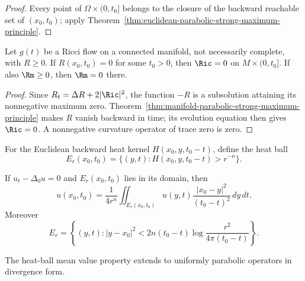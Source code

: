 \begin{proof}
\sketch
Every point of $\Omega\times(0,t_0]$ belongs to the closure of the backward
reachable set of $(x_0,t_0)$; apply
Theorem~\ref{thm:euclidean-parabolic-strong-maximum-principle}.
\end{proof}

\begin{corollary}
\label{cor:ricci-flow-scalar-curvature-strong-maximum-principle}
Let $g(t)$ be a Ricci flow on a connected manifold, not necessarily complete,
with $R\geq0$.  If $R(x_0,t_0)=0$ for some $t_0>0$, then
$\Ric=0$ on $M\times(0,t_0]$.  If also $\Rm\geq0$, then $\Rm=0$ there.
\end{corollary}

\begin{proof}
\sketch
Since $R_t=\Delta R+2|\Ric|^2$, the function $-R$ is a subsolution attaining
its nonnegative maximum zero.  Theorem~\ref{thm:manifold-parabolic-strong-maximum-principle}
makes $R$ vanish backward in time; its evolution equation then gives
$\Ric=0$.  A nonnegative curvature operator of trace zero is zero.
\end{proof}

For the Euclidean backward heat kernel $H(x_0,y,t_0-t)$, define the heat ball
\[
E_r(x_0,t_0)=\{(y,t):H(x_0,y,t_0-t)>r^{-n}\}.
\]

\begin{corollary}
\label{cor:euclidean-heat-mean-value-property}
If $u_t-\Delta_0u=0$ and $E_r(x_0,t_0)$ lies in its domain, then
\[
u(x_0,t_0)=\frac1{4r^n}\iint_{E_r(x_0,t_0)}
u(y,t)\frac{|x_0-y|^2}{(t_0-t)^2}\,dy\,dt.
\]
Moreover
\[
E_r=\left\{(y,t):|y-x_0|^2<2n(t_0-t)
\log\frac{r^2}{4\pi(t_0-t)}\right\}.
\]
\end{corollary}

\begin{remark}
\label{rem:divergence-form-mean-value-property}
The heat-ball mean value property extends to uniformly parabolic operators in
divergence form.
\end{remark}

